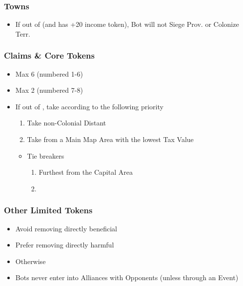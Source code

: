 \documentclass[10pt]{article}
\begin{document}
\subsubsection*{Towns}
\begin{itemize}
	\item If out of \towns (and has +20 income token), Bot will not Siege Prov. or Colonize Terr.
\end{itemize}

\subsubsection*{Claims \& Core Tokens}
\begin{itemize}
	\item Max 6 \claims (numbered 1-6)
	\item Max 2 \cores (numbered 7-8)
	\item If out of \claims, take according to the following priority
	\begin{enumerate}
		\item Take non-Colonial Distant \claims
		\item Take \claims from a Main Map Area with the lowest Tax Value
	\end{enumerate}
	\begin{itemize}
		\item Tie breakers
		\begin{enumerate}
			\item Furthest from the Capital Area
			\item \az
		\end{enumerate}
	\end{itemize}
\end{itemize}

\subsubsection*{Other Limited Tokens}
\begin{itemize}
	\item Avoid removing directly beneficial
	\item Prefer removing directly harmful
	\item Otherwise \az
\end{itemize}

\begin{itemize}
	\item Bots never enter into Alliances with Opponents (unless through an Event)
\end{itemize}
\end{document}
